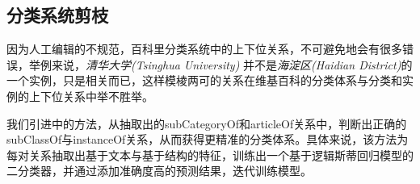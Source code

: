 %
%
%
%

\subsection{分类系统剪枝}
\label{sec5:taxonomy-prune}

因为人工编辑的不规范，百科里分类系统中的上下位关系，不可避免地会有很多错误，举例来说，\textit{清华大学(Tsinghua University)} 并不是\textit{海淀区(Haidian District)}的一个实例，只是相关而已，这样模棱两可的关系在维基百科的分类体系与分类和实例的上下位关系中举不胜举。

我们引进\cite{wang2014cross}中的方法，从抽取出的subCategoryOf和articleOf关系中，判断出正确的subClassOf与instanceOf关系，从而获得更精准的分类体系。具体来说，该方法为每对关系抽取出基于文本与基于结构的特征，训练出一个基于逻辑斯蒂回归模型的二分类器，并通过添加准确度高的预测结果，迭代训练模型。

